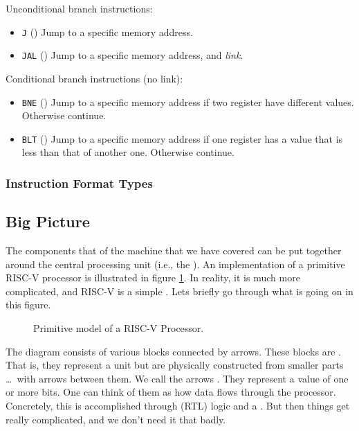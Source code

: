 
Unconditional branch instructions:
\begin{itemize}
  \item \texttt{J} () Jump to a specific memory address.
  \item \texttt{JAL} () Jump to a specific memory address, and \textsl{link}.
\end{itemize}

Conditional branch instructions (no link):
\begin{itemize}
  \item \texttt{BNE} () Jump to a specific memory address if two register have different values. Otherwise continue.
  \item \texttt{BLT} () Jump to a specific memory address if one register has a value that is less than that of another one. Otherwise continue.
\end{itemize}

\subsubsection{Instruction Format Types}


\subsection{Big Picture}

The components that of the machine that we have covered can be put together around the central processing unit (i.e., the ). An implementation of a primitive RISC-V processor is illustrated in figure \ref{fig:machine:riscv}. In reality, it is much more complicated, and RISC-V is a simple . Lets briefly go through what is going on in this figure.

\begin{figure}[tbp]
  
  \caption{Primitive model of a RISC-V Processor.}
  \label{fig:machine:riscv}
\end{figure}

The diagram consists of various blocks connected by arrows. These blocks are . That is, they represent a  unit but are physically constructed from smaller parts \ldots\ with arrows between them. We call the arrows . They represent a value of one or more bits. One can think of them as how data flows through the processor. Concretely, this is accomplished through  (RTL) logic and a . But then things get really complicated, and we don't need it that badly.

